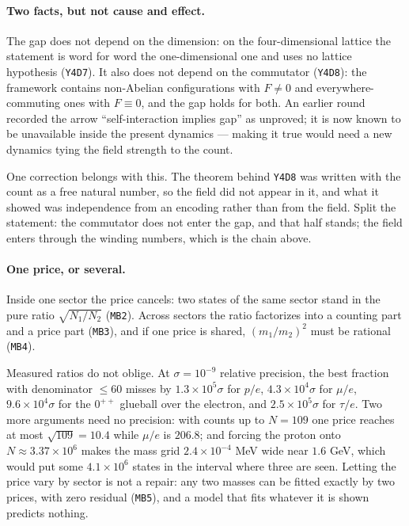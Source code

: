 \documentclass[aps,prd,preprint,superscriptaddress,amsmath,amssymb]{revtex4-2}
\begin{document}
\paragraph{Two facts, but not cause and effect.}
The gap does not depend on the dimension: on the four-dimensional lattice the
statement is word for word the one-dimensional one and uses no lattice
hypothesis (\texttt{Y4D7}).  It also does not depend on the commutator
(\texttt{Y4D8}): the framework contains non-Abelian configurations with
$F\ne0$ and everywhere-commuting ones with $F\equiv0$, and the gap holds for
both.  An earlier round recorded the arrow ``self-interaction implies
gap'' as unproved; it is now known to be unavailable inside the present
dynamics --- making it true would need a new dynamics tying the field
strength to the count.

One correction belongs with this.  The theorem behind \texttt{Y4D8} was
written with the count as a free natural number, so the field did not appear
in it, and what it showed was independence from an encoding rather than from
the field.  Split the statement: the commutator does not enter the gap, and
that half stands; the field enters through the winding numbers, which is the
chain above.

\paragraph{One price, or several.}
Inside one sector the price cancels: two states of the same sector stand in
the pure ratio $\sqrt{N_1/N_2}$ (\texttt{MB2}).  Across sectors the ratio
factorizes into a counting part and a price part (\texttt{MB3}), and if one
price is shared, $(m_1/m_2)^2$ must be rational (\texttt{MB4}).

Measured ratios do not oblige.  At $\sigma=10^{-9}$ relative precision, the
best fraction with denominator $\le60$ misses by $1.3\times10^{5}\sigma$ for
$p/e$, $4.3\times10^{4}\sigma$ for $\mu/e$, $9.6\times10^{4}\sigma$ for the
$0^{++}$ glueball over the electron, and $2.5\times10^{5}\sigma$ for
$\tau/e$.  Two more arguments need no precision: with counts up to $N=109$
one price reaches at most $\sqrt{109}=10.4$ while $\mu/e$ is $206.8$; and
forcing the proton onto $N\approx3.37\times10^{6}$ makes the mass grid
$2.4\times10^{-4}$ MeV wide near $1.6$ GeV, which would put some
$4.1\times10^{6}$ states in the interval where three are seen.  Letting the
price vary by sector is not a repair: any two masses can be fitted exactly by
two prices, with zero residual (\texttt{MB5}), and a model that fits whatever
it is shown predicts nothing.
\end{document}
